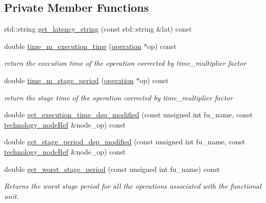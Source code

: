 \subsection*{Private Member Functions}
\begin{DoxyCompactItemize}
\item 
std\+::string \hyperlink{classAllocationInformation_a0fcc083348815a0f1e64767c4ce3aa89}{get\+\_\+latency\+\_\+string} (const std\+::string \&lat) const
\item 
double \hyperlink{classAllocationInformation_a30a7b6425810143360160ce414f96e58}{time\+\_\+m\+\_\+execution\+\_\+time} (\hyperlink{structoperation}{operation} $\ast$op) const
\begin{DoxyCompactList}\small\item\em return the execution time of the operation corrected by time\+\_\+multiplier factor \end{DoxyCompactList}\item 
double \hyperlink{classAllocationInformation_affde532d961cc0d77553c6ce12e0cc6b}{time\+\_\+m\+\_\+stage\+\_\+period} (\hyperlink{structoperation}{operation} $\ast$op) const
\begin{DoxyCompactList}\small\item\em return the stage time of the operation corrected by time\+\_\+multiplier factor \end{DoxyCompactList}\item 
double \hyperlink{classAllocationInformation_a242d6db211604c5f03c4bbe79190086b}{get\+\_\+execution\+\_\+time\+\_\+dsp\+\_\+modified} (const unsigned int fu\+\_\+name, const \hyperlink{technology__node_8hpp_a33dd193b7bd6b987bf0d8a770a819fa7}{technology\+\_\+node\+Ref} \&node\+\_\+op) const
\item 
double \hyperlink{classAllocationInformation_aa7b6b9949f60f144839b167b83711994}{get\+\_\+stage\+\_\+period\+\_\+dsp\+\_\+modified} (const unsigned int fu\+\_\+name, const \hyperlink{technology__node_8hpp_a33dd193b7bd6b987bf0d8a770a819fa7}{technology\+\_\+node\+Ref} \&node\+\_\+op) const
\item 
double \hyperlink{classAllocationInformation_a86d1df5f0669734901d715e740200c1c}{get\+\_\+worst\+\_\+stage\+\_\+period} (const unsigned int fu\+\_\+name) const
\begin{DoxyCompactList}\small\item\em Returns the worst stage period for all the operations associated with the functional unit. \end{DoxyCompactList}\item 

\end{DoxyCompactItemize}
